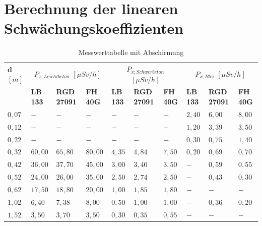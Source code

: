 \documentclass[12pt,german]{article}
\begin{document}
    \section{Berechnung der linearen Schwächungskoeffizienten}
    \begin{table}[H]
        \begin{tabularx}{\textwidth}{X|X|X|X|X|X|X|X|X|X}
            \toprule
            \textbf{d} $[m]$ & \multicolumn{3}{c|}{\textbf{\( P_{x; Leichtbeton} \)} $[\mu Sv/h]$} & \multicolumn{3}{c|}{\textbf{\( P_{x; Schwerbeton} \)} $[\mu Sv/h]$} & \multicolumn{3}{c}{\textbf{\( P_{x; Blei} \)} $[\mu Sv/h]$} \\
            \cmidrule{2-10}
            & \textbf{LB 133} & \textbf{RGD 27091} & \textbf{FH 40G} & \textbf{LB 133} & \textbf{RGD 27091} & \textbf{FH 40G} & \textbf{LB 133} & \textbf{RGD 27091} & \textbf{FH 40G} \\
            \midrule
            $   0,07 $ & $     -  $ & $     -  $ & $     -  $ & $     -  $ & $     -  $ & $     -  $ & $   2,40 $ & $   6,00 $ & $   8,00 $ \\
            $   0,12 $ & $     -  $ & $     -  $ & $     -  $ & $     -  $ & $     -  $ & $     -  $ & $   1,20 $ & $   3,39 $ & $   3,50 $ \\
            $   0,22 $ & $     -  $ & $     -  $ & $     -  $ & $     -  $ & $     -  $ & $     -  $ & $   0,30 $ & $   0,75 $ & $   1,40 $ \\
            $   0,32 $ & $  60,00 $ & $  65,80 $ & $  80,00 $ & $   4,35 $ & $   4,84 $ & $   7,50 $ & $   0,20 $ & $   0,69 $ & $   0,70 $ \\
            $   0,42 $ & $  36,00 $ & $  37,70 $ & $  45,00 $ & $   3,00 $ & $   3,40 $ & $   3,50 $ & $     -  $ & $   0,59 $ & $   0,55 $ \\
            $   0,52 $ & $  24,00 $ & $  26,00 $ & $  35,00 $ & $   2,50 $ & $   2,74 $ & $   2,50 $ & $     -  $ & $   0,43 $ & $   0,30 $ \\
            $   0,62 $ & $  17,50 $ & $  18,80 $ & $  20,00 $ & $   1,00 $ & $   1,85 $ & $   1,80 $ & $     -  $ & $     -  $ & $     -  $ \\
            $   1,02 $ & $   6,40 $ & $   7,38 $ & $   8,00 $ & $   0,50 $ & $   1,00 $ & $   1,00 $ & $     -  $ & $   0,36 $ & $   0,20 $ \\
            $   1,52 $ & $   3,50 $ & $   3,70 $ & $   3,50 $ & $   0,30 $ & $   0,35 $ & $   0,55 $ & $     -  $ & $     -  $ & $     -  $ \\
            \bottomrule
        \end{tabularx}
        \caption{Messwerttabelle mit Abschirmung}
    \end{table}
\end{document}
